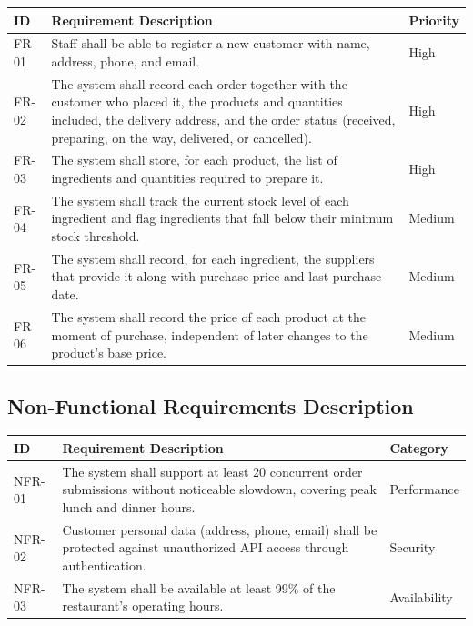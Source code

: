 \documentclass[11pt]{article}
\renewcommand{\_}{\oldunderscore\allowbreak}
\begin{document}
\begin{longtable}{@{}p{2cm}p{9.5cm}p{2cm}@{}}
\toprule
\textbf{ID} & \textbf{Requirement Description} & \textbf{Priority} \\
\midrule
\endhead
FR-01 & Staff shall be able to register a new customer with name, address, phone, and email. & High \\[0.6em]
FR-02 & The system shall record each order together with the customer who placed it, the products and quantities included, the delivery address, and the order status (received, preparing, on the way, delivered, or cancelled). & High \\[0.6em]
FR-03 & The system shall store, for each product, the list of ingredients and quantities required to prepare it. & High \\[0.6em]
FR-04 & The system shall track the current stock level of each ingredient and flag ingredients that fall below their minimum stock threshold. & Medium \\[0.6em]
FR-05 & The system shall record, for each ingredient, the suppliers that provide it along with purchase price and last purchase date. & Medium \\[0.6em]
FR-06 & The system shall record the price of each product at the moment of purchase, independent of later changes to the product's base price. & Medium \\[0.6em]
\bottomrule
\end{longtable}

\subsection{Non-Functional Requirements Description}

\begin{longtable}{@{}p{2cm}p{9.5cm}p{2cm}@{}}
\toprule
\textbf{ID} & \textbf{Requirement Description} & \textbf{Category} \\
\midrule
\endhead
NFR-01 & The system shall support at least 20 concurrent order submissions without noticeable slowdown, covering peak lunch and dinner hours. & Performance \\[0.6em]
NFR-02 & Customer personal data (address, phone, email) shall be protected against unauthorized API access through authentication. & Security \\[0.6em]
NFR-03 & The system shall be available at least 99\% of the restaurant's operating hours. & Availability \\[0.6em]
\bottomrule
\end{longtable}
\end{document}

